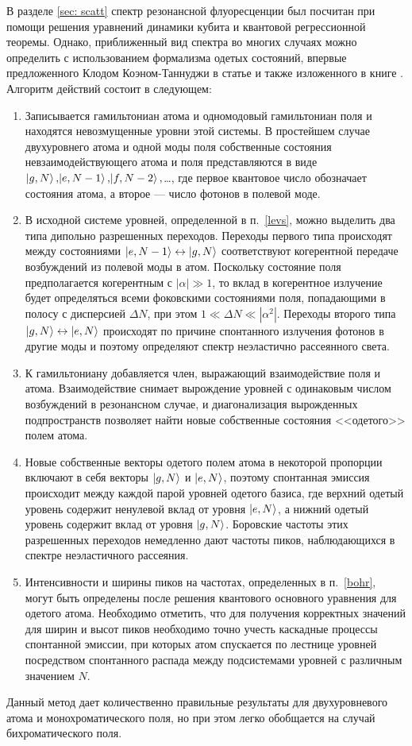 В разделе \ref{sec: scatt} спектр резонансной флуоресценции был посчитан при помощи решения уравнений динамики кубита и квантовой регрессионной теоремы. Однако, приближенный вид спектра во многих случаях можно определить с использованием формализма одетых состояний, впервые предложенного Клодом Коэном-Таннуджи в статье \cite{cohen1977dressed} и также изложенного в книге \cite{cohen1998atom}. Алгоритм действий состоит в следующем:
\begin{enumerate}
	\item \label{levs} Записывается гамильтониан атома и одномодовый гамильтониан поля и находятся невозмущенные уровни этой системы. В простейшем случае двухуровнего атома и одной моды поля собственные состояния невзаимодействующего атома и поля представляются в виде $\ket{g, N},\!\ket{e, N-1},\!\ket{f, N-2},$\ldots, где первое квантовое число обозначает состояния атома, а второе --- число фотонов в полевой моде. 
	\item В исходной системе уровней, определенной в п.~\ref{levs}, можно выделить два типа дипольно разрешенных переходов. Переходы первого типа происходят между состояниями $\ket{e,N-1} \leftrightarrow \ket{g,N}$ соответствуют когерентной передаче возбуждений из полевой моды в атом. Поскольку состояние поля предполагается когерентным с $|\alpha| \gg 1$, то вклад в когерентное излучение будет определяться всеми фоковскими состояниями поля, попадающими в полосу с  дисперсией $\Delta N$, при этом $1 \ll \Delta N \ll |\alpha^2|$. Переходы второго типа $\ket{g, N} \leftrightarrow \ket{e, N} $ происходят по причине спонтанного излучения фотонов в другие моды и поэтому определяют спектр неэластично рассеянного света. 
	\item К гамильтониану добавляется член, выражающий взаимодействие поля и атома. Взаимодействие снимает вырождение уровней с одинаковым числом возбуждений в резонансном случае, и диагонализация вырожденных подпространств позволяет найти новые собственные состояния <<одетого>> полем атома.
	\item \label{bohr}Новые собственные векторы одетого полем атома в некоторой пропорции включают в себя векторы $\ket{g, N}$ и $\ket{e, N}$, поэтому спонтанная эмиссия происходит между каждой парой уровней одетого базиса, где верхний одетый уровень содержит ненулевой вклад от уровня $\ket{e, N}$, а нижний одетый уровень содержит вклад от уровня $\ket{g,N}$. Боровские частоты этих разрешенных переходов немедленно дают частоты пиков, наблюдающихся в спектре неэластичного рассеяния.
	\item Интенсивности и ширины пиков на частотах, определенных в п.~\ref{bohr}, могут быть определены после решения квантового основного уравнения для одетого атома. Необходимо отметить, что для получения корректных значений для ширин и высот пиков необходимо точно учесть каскадные процессы спонтанной эмиссии, при которых атом спускается по лестнице уровней посредством спонтанного распада между подсистемами уровней с различным значением $N$.
\end{enumerate}
Данный метод дает количественно правильные результаты для двухуровневого атома и монохроматического поля, но при этом легко обобщается на случай бихроматического поля. 


